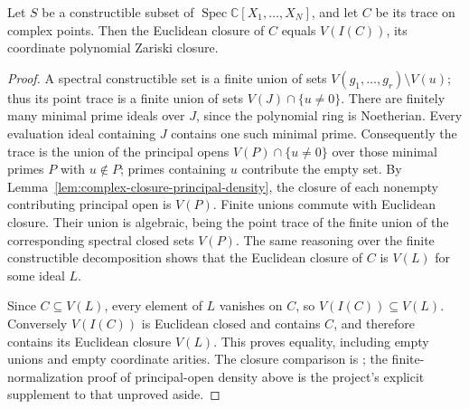 \begin{lemma}
\label{lem:balanced-constructible-closure}
\leanok
Let $S$ be a constructible subset of
$\operatorname{Spec}\mathbb C[X_1,\ldots,X_N]$, and let $C$ be its trace
on complex points. Then the Euclidean closure of $C$ equals $V(I(C))$,
its coordinate polynomial Zariski closure.
\end{lemma}
\begin{proof}
A spectral constructible set is a finite union of sets
$V(g_1,\ldots,g_r)\setminus V(u)$; thus its point trace is a finite
union of sets $V(J)\cap\{u\ne0\}$. There are finitely many minimal
prime ideals over $J$, since the polynomial ring is Noetherian.
Every evaluation ideal containing $J$ contains one such minimal prime.
Consequently the trace is the union of the principal opens
$V(P)\cap\{u\ne0\}$ over those minimal primes $P$ with $u\notin P$;
primes containing $u$ contribute the empty set. By
Lemma~\ref{lem:complex-closure-principal-density}, the closure of each
nonempty contributing principal open is $V(P)$. Finite unions commute
with Euclidean closure. Their union is algebraic, being the point trace
of the finite union of the corresponding spectral closed sets $V(P)$.
The same reasoning over the finite constructible decomposition shows
that the Euclidean closure of $C$ is $V(L)$ for some ideal $L$.

Since $C\subseteq V(L)$, every element of $L$ vanishes on $C$,
so $V(I(C))\subseteq V(L)$. Conversely $V(I(C))$ is Euclidean closed
and contains $C$, and therefore contains its Euclidean closure $V(L)$.
This proves equality, including empty unions and empty coordinate arities.
The closure comparison is \cite[Aside 9.8]{milne-algebraic-geometry};
the finite-normalization proof of principal-open density above is the
project's explicit supplement to that unproved aside.
\end{proof}



